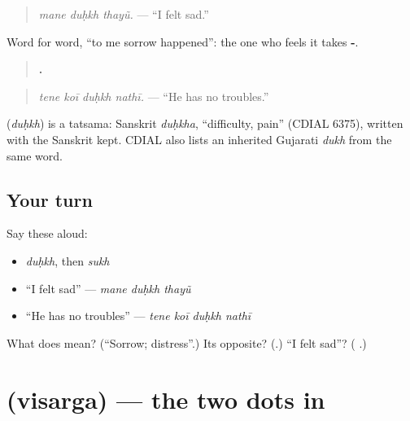 \begin{quote}
\emph{mane duḥkh thayũ.} — \textquotedblleft{}I felt sad.\textquotedblright{}
\end{quote}

Word for word, \textquotedblleft{}to me sorrow happened\textquotedblright{}: the one who feels it takes \textbf{-}.

\begin{quote}
\textbf{   .}
\end{quote}

\begin{quote}
\emph{tene koī duḥkh nathī.} — \textquotedblleft{}He has no troubles.\textquotedblright{}
\end{quote}

\begin{cousinweb}
\textbf{} (\emph{duḥkh}) is a tatsama: Sanskrit \emph{duḥkha}, \textquotedblleft{}difficulty, pain\textquotedblright{} (CDIAL 6375), written with the Sanskrit \textbf{} kept. CDIAL also lists an inherited Gujarati \emph{dukh} from the same word.
\end{cousinweb}

\subsection*{Your turn}
Say these aloud:

\begin{itemize}
\raggedright
  \item \emph{duḥkh}, then \emph{sukh}
  \item \textquotedblleft{}I felt sad\textquotedblright{} — \emph{mane duḥkh thayũ}
  \item \textquotedblleft{}He has no troubles\textquotedblright{} — \emph{tene koī duḥkh nathī}
\end{itemize}

\begin{tcolorbox}[breakable,colback=teal!4,colframe=teal!35!black,title={Before you move on}]
What does \textbf{} mean? (\textquotedblleft{}Sorrow; distress\textquotedblright{}.) Its opposite? (\textbf{}.) \textquotedblleft{}I felt sad\textquotedblright{}? (\textbf{  }.)
\end{tcolorbox}
\section[\texorpdfstring{\gu{ઃ} (visarga)}{ઃ (visarga)}]{ (visarga) — the two dots in }

